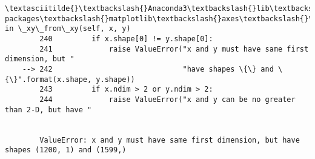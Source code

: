 \documentclass[11pt]{article}
\begin{document}
\begin{Verbatim}[commandchars=\\\{\}]
        \textasciitilde{}\textbackslash{}Anaconda3\textbackslash{}lib\textbackslash{}site-packages\textbackslash{}matplotlib\textbackslash{}axes\textbackslash{}\_base.py in \_xy\_from\_xy(self, x, y)
        240         if x.shape[0] != y.shape[0]:
        241             raise ValueError("x and y must have same first dimension, but "
    --> 242                              "have shapes \{\} and \{\}".format(x.shape, y.shape))
        243         if x.ndim > 2 or y.ndim > 2:
        244             raise ValueError("x and y can be no greater than 2-D, but have "
    

        ValueError: x and y must have same first dimension, but have shapes (1200, 1) and (1599,)

    \end{Verbatim}

    \begin{center}
    \end{center}
    { \hspace*{\fill} \\}
    

    
    
    
    
\end{document}
